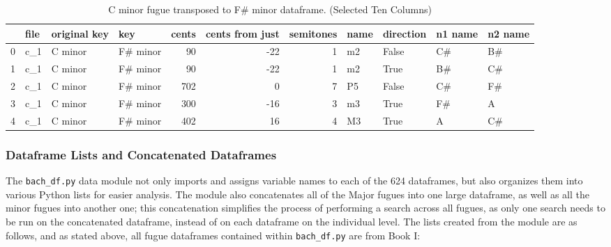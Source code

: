 \begin{singlespace}
\begin{table}[H]
\centering
\tiny
\begin{tabular}{|llllrrrllll|}
\hline
\textbf{{}} & \textbf{file} & \textbf{original key} & \textbf{      key} & \textbf{ cents} & \textbf{ cents from just} & \textbf{ semitones} & \textbf{name} & \textbf{direction} & \textbf{n1 name} & \textbf{n2 name }\\
\hline
0 &  c\_1 &      C minor &  F\# minor &     90 &              -22 &          1 &   m2 &     False &      C\# &      B\# \\
1 &  c\_1 &      C minor &  F\# minor &     90 &              -22 &          1 &   m2 &      True &      B\# &      C\# \\
2 &  c\_1 &      C minor &  F\# minor &    702 &                0 &          7 &   P5 &     False &      C\# &      F\# \\
3 &  c\_1 &      C minor &  F\# minor &    300 &              -16 &          3 &   m3 &      True &      F\# &       A \\
4 &  c\_1 &      C minor &  F\# minor &    402 &               16 &          4 &   M3 &      True &       A &      C\# \\
\hline
\end{tabular}
\caption{C minor fugue transposed to F\# minor dataframe. (Selected Ten Columns) }
\end{table}
\normalsize
\end{singlespace}


    \subsubsection{Dataframe Lists and Concatenated
Dataframes}\label{dataframe-lists-and-concatenated-dataframes}

The \texttt{bach\_df.py} data module not only imports and assigns
variable names to each of the 624 dataframes, but also organizes them
into various Python lists for easier analysis. The module also
concatenates all of the Major fugues into one large dataframe, as well
as all the minor fugues into another one; this concatenation simplifies
the process of performing a search across all fugues, as only one search
needs to be run on the concatenated dataframe, instead of on each
dataframe on the individual level. The lists created from the module are
as follows, and as stated above, all fugue dataframes contained within
\texttt{bach\_df.py} are from Book I:

